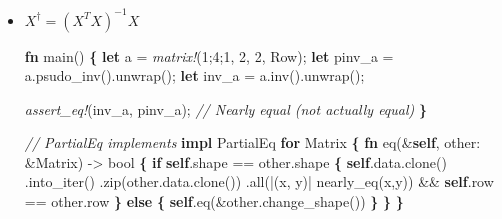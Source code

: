 \documentclass[]{book}
\newenvironment{Shaded}{\begin{snugshade}}{\end{snugshade}}
\newcommand{\BuiltInTok}[1]{#1}
\newcommand{\CommentTok}[1]{\textcolor[rgb]{0.56,0.35,0.01}{\textit{#1}}}
\newcommand{\DataTypeTok}[1]{\textcolor[rgb]{0.13,0.29,0.53}{#1}}
\newcommand{\DecValTok}[1]{\textcolor[rgb]{0.00,0.00,0.81}{#1}}
\newcommand{\KeywordTok}[1]{\textcolor[rgb]{0.13,0.29,0.53}{\textbf{#1}}}
\newcommand{\NormalTok}[1]{#1}
\newcommand{\OperatorTok}[1]{\textcolor[rgb]{0.81,0.36,0.00}{\textbf{#1}}}
\newcommand{\PreprocessorTok}[1]{\textcolor[rgb]{0.56,0.35,0.01}{\textit{#1}}}
\begin{document}
\begin{itemize}
\item
  \(X^\dagger = \left(X^T X\right)^{-1} X\)

\begin{Shaded}
\begin{Highlighting}[]
\KeywordTok{fn}\NormalTok{ main() }\OperatorTok{\{}
    \KeywordTok{let}\NormalTok{ a = }\PreprocessorTok{matrix!}\NormalTok{(}\DecValTok{1}\NormalTok{;}\DecValTok{4}\NormalTok{;}\DecValTok{1}\NormalTok{, }\DecValTok{2}\NormalTok{, }\DecValTok{2}\NormalTok{, Row);}
    \KeywordTok{let}\NormalTok{ pinv_a = a.psudo_inv().unwrap();}
    \KeywordTok{let}\NormalTok{ inv_a = a.inv().unwrap();}

    \PreprocessorTok{assert_eq!}\NormalTok{(inv_a, pinv_a); }\CommentTok{// Nearly equal (not actually equal)}
\OperatorTok{\}}

\CommentTok{// PartialEq implements}
\KeywordTok{impl} \BuiltInTok{PartialEq} \KeywordTok{for}\NormalTok{ Matrix }\OperatorTok{\{}
    \KeywordTok{fn}\NormalTok{ eq(&}\KeywordTok{self}\NormalTok{, other: &Matrix) -> }\DataTypeTok{bool} \OperatorTok{\{}
        \KeywordTok{if} \KeywordTok{self}\NormalTok{.shape == other.shape }\OperatorTok{\{}
            \KeywordTok{self}\NormalTok{.data.clone()}
\NormalTok{                .into_iter()}
\NormalTok{                .zip(other.data.clone())}
\NormalTok{                .all(|(x, y)| nearly_eq(x,y)) && }\KeywordTok{self}\NormalTok{.row == other.row}
        \OperatorTok{\}} \KeywordTok{else} \OperatorTok{\{}
            \KeywordTok{self}\NormalTok{.eq(&other.change_shape())}
        \OperatorTok{\}}
    \OperatorTok{\}}
\OperatorTok{\}}
\end{Highlighting}
\end{Shaded}
\end{itemize}


\end{document}
